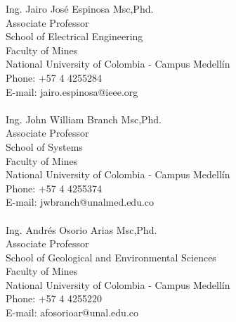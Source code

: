 \begin{resume}
Ing. Jairo Jos\'{e} Espinosa Msc,Phd.\\
Associate Professor \\
School of Electrical Engineering \\
Faculty of Mines \\
National University of Colombia - Campus Medell\'{i}n\\
Phone: +57 4 4255284 \\
E-mail: jairo.espinosa@ieee.org\\
\\  
Ing. John William Branch Msc,Phd.\\
Associate Professor \\
School of Systems  \\
Faculty of Mines \\
National University of Colombia - Campus Medell\'{i}n\\
Phone: +57 4 4255374 \\
E-mail: jwbranch@unalmed.edu.co\\
\\  
Ing. Andr\'{e}s Osorio Arias Msc,Phd.\\
Associate Professor \\
School of Geological and Environmental Sciences \\
Faculty of Mines \\
National University of Colombia - Campus Medell\'{i}n\\
Phone: +57 4 4255220 \\
E-mail: afosorioar@unal.edu.co\\
\\  



\end{resume}

